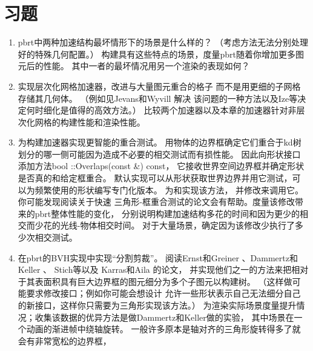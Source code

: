\section{习题}\label{sec:习题04}

\begin{enumerate}
    \item \circletwo pbrt中两种加速结构最坏情形下的场景是什么样的？
          （考虑方法无法分别处理好的特殊几何配置。）
          构建具有这些特点的场景，度量pbrt随着你增加更多图元后的性能。
          其中一者的最坏情况用另一个渲染的表现如何？
    \item \circletwo 实现层次化网格加速器，改进与大量图元重合的格子
          而不是用更细的子网格存储其几何体。
          （例如见Jevans和Wyvill \parencite*{Jevans1989:23}解决
          该问题的一种方法以及Ize等\parencite*{4342587}决定何时细化是值得的高效方法。）
          比较两个加速器以及本章的加速器针对非层次化网格的构建性能和渲染性能。
    \item \circletwo 为构建加速器实现更智能的重合测试。
          用物体的边界框确定它们重合于kd树划分的哪一侧可能因为造成不必要的相交测试而有损性能。
          因此向形状接口添加方法{\ttfamily bool ::Overlaps(const  \&) const}，
          它接收世界空间边界框并确定形状是否真的和给定框重合。
          默认实现可以从形状获取世界边界并用它测试，可以为频繁使用的形状编写专门化版本。
          为和实现该方法，
          并修改来调用它。
          你可能发现阅读\citet{doi:10.1080/10867651.2001.10487535}关于快速
          三角形-框重合测试的论文会有帮助。度量该修改带来的pbrt整体性能的变化，
          分别说明构建加速结构多花的时间和因为更少的相交而少花的光线-物体相交时间。
          对于大量场景，确定因为该修改少执行了多少次相交测试。
    \item \circletwo 在pbrt的BVH实现中实现“分割剪裁”。
          阅读Ernst和Greiner \parencite*{4342593}、Dammertz和Keller \parencite*{4634636}、
          Stich等\parencite*{10.1145/1572769.1572771}以及
          Karras和Aila \parencite*{10.1145/2492045.2492055}的论文，
          并实现他们之一的方法来把相对于其表面积具有巨大边界框的图元细分为多个子图元以构建树。
          （这样做可能要求修改接口；例如你可能会想设计
          允许一些形状表示自己无法细分自己的新接口，这样你只需要为三角形实现该方法。）
          为渲染实际场景度量提升情况；收集该数据的优异方法是做Dammertz和Keller做的实验，
          其中场景在一个动画的渐进帧中绕轴旋转。
          一般许多原本是轴对齐的三角形旋转得多了就会有非常宽松的边界框，

\end{enumerate}
